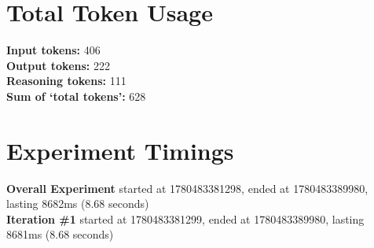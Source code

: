 \documentclass{article}
\begin{document}
\section*{Total Token Usage}
\textbf{Input tokens: }406
\\\textbf{Output tokens: }222
\\\textbf{Reasoning tokens: }111
\\\textbf{Sum of `total tokens': }628
\section*{Experiment Timings}
\textbf{Overall Experiment} started at 1780483381298, ended at 1780483389980, lasting 8682ms (8.68 seconds)
\\\textbf{Iteration \#1} started at 1780483381299, ended at 1780483389980, lasting 8681ms (8.68 seconds)
\end{document}

